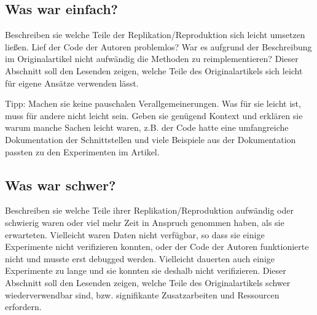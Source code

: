 \documentclass[DIV=13,fontsize=11pt]{scrartcl}
\begin{document}


\subsection{Was war einfach?}
Beschreiben sie welche Teile der Replikation/Reproduktion sich leicht umsetzen ließen.
Lief der Code der Autoren problemlos? War es aufgrund der Beschreibung im Originalartikel nicht aufwändig die Methoden zu reimplementieren? 
Dieser Abschnitt soll den Lesenden zeigen, welche Teile des Originalartikels sich leicht für eigene Ansätze verwenden lässt. 


Tipp: Machen sie keine pauschalen Verallgemeinerungen. Was für sie leicht ist, muss für andere nicht leicht sein. Geben sie genügend Kontext und erklären sie warum manche Sachen leicht waren, z.B. der Code hatte eine umfangreiche Dokumentation der Schnittstellen und viele Beispiele aus der Dokumentation passten zu den Experimenten im Artikel. 


\subsection{Was war schwer?}
Beschreiben sie welche Teile ihrer Replikation/Reproduktion aufwändig oder schwierig waren oder viel mehr Zeit in Anspruch genommen haben, als sie erwarteten.
Vielleicht waren Daten nicht verfügbar, so dass sie einige Experimente nicht verifizieren konnten, oder der Code der Autoren funktionierte nicht und musste erst debugged werden.
Vielleicht dauerten auch einige Experimente zu lange und sie konnten sie deshalb nicht verifizieren.
Dieser Abschnitt soll den Lesenden zeigen, welche Teile des Originalartikels schwer wiederverwendbar sind, bzw. signifikante Zusatzarbeiten und Ressourcen erfordern. 
\end{document}
